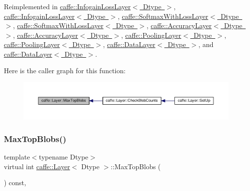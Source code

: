 Reimplemented in \mbox{\hyperlink{classcaffe_1_1_infogain_loss_layer_a93019601c6256354fd4758da91d9311f}{caffe\+::\+Infogain\+Loss\+Layer$<$ Dtype $>$}}, \mbox{\hyperlink{classcaffe_1_1_infogain_loss_layer_a93019601c6256354fd4758da91d9311f}{caffe\+::\+Infogain\+Loss\+Layer$<$ Dtype $>$}}, \mbox{\hyperlink{classcaffe_1_1_softmax_with_loss_layer_a5a0b4c02fe76ae9087cd8b1b9edd9910}{caffe\+::\+Softmax\+With\+Loss\+Layer$<$ Dtype $>$}}, \mbox{\hyperlink{classcaffe_1_1_softmax_with_loss_layer_a5a0b4c02fe76ae9087cd8b1b9edd9910}{caffe\+::\+Softmax\+With\+Loss\+Layer$<$ Dtype $>$}}, \mbox{\hyperlink{classcaffe_1_1_accuracy_layer_a7591ae6d50dd7d96b91241b5b0368997}{caffe\+::\+Accuracy\+Layer$<$ Dtype $>$}}, \mbox{\hyperlink{classcaffe_1_1_accuracy_layer_a7591ae6d50dd7d96b91241b5b0368997}{caffe\+::\+Accuracy\+Layer$<$ Dtype $>$}}, \mbox{\hyperlink{classcaffe_1_1_pooling_layer_a76539d04ef7252c12e932ea703f8246b}{caffe\+::\+Pooling\+Layer$<$ Dtype $>$}}, \mbox{\hyperlink{classcaffe_1_1_pooling_layer_a76539d04ef7252c12e932ea703f8246b}{caffe\+::\+Pooling\+Layer$<$ Dtype $>$}}, \mbox{\hyperlink{classcaffe_1_1_data_layer_ac47e9f3bff3db9d7364f6c392427745c}{caffe\+::\+Data\+Layer$<$ Dtype $>$}}, and \mbox{\hyperlink{classcaffe_1_1_data_layer_ac47e9f3bff3db9d7364f6c392427745c}{caffe\+::\+Data\+Layer$<$ Dtype $>$}}.

Here is the caller graph for this function\+:
\nopagebreak
\begin{figure}[H]
\begin{center}
\leavevmode
\includegraphics[width=350pt]{classcaffe_1_1_layer_ac6c03df0b6e40e776c94001e19994a2e_icgraph}
\end{center}
\end{figure}
\mbox{\label{classcaffe_1_1_layer_ac6c03df0b6e40e776c94001e19994a2e}} 
\subsubsection{\texorpdfstring{Max\+Top\+Blobs()}{MaxTopBlobs()}\hspace{0.1cm}{\footnotesize\ttfamily [2/2]}}
{\footnotesize\ttfamily template$<$typename Dtype$>$ \\
virtual int \mbox{\hyperlink{classcaffe_1_1_layer}{caffe\+::\+Layer}}$<$ Dtype $>$\+::Max\+Top\+Blobs (\begin{DoxyParamCaption}{ }\end{DoxyParamCaption}) const\hspace{0.3cm}{\ttfamily [inline]}, {\ttfamily [virtual]}}



